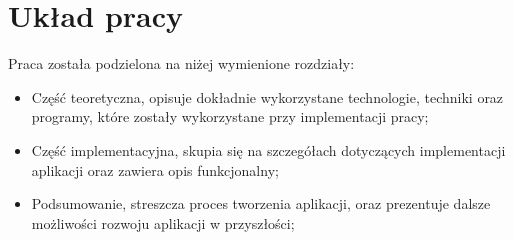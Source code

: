 \section{Układ pracy}
Praca została podzielona na niżej wymienione rozdziały:
\begin{itemize}[leftmargin=1cm]
    \item Część teoretyczna, opisuje dokładnie wykorzystane technologie, techniki oraz programy, które zostały wykorzystane przy implementacji pracy;

    \item Część implementacyjna, skupia się na szczegółach dotyczących implementacji aplikacji oraz zawiera opis funkcjonalny;

    \item Podsumowanie, streszcza proces tworzenia aplikacji, oraz prezentuje dalsze możliwości rozwoju aplikacji w przyszłości;
\end{itemize}

